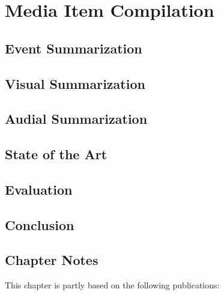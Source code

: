 

\chapter{Media Item Compilation}

\ifpdf
    \graphicspath{{8_media_item_compilation/figures/PNG/}{8_media_item_compilation/figures/PDF/}{8_media_item_compilation/figures/}}
\else
    \graphicspath{{8_media_item_compilation/figures/EPS/}{8_media_item_compilation/figures/}}
\fi


\section{Event Summarization}

\section{Visual Summarization}

\section{Audial Summarization}

\section{State of the Art}

\section{Evaluation}

\section{Conclusion}

\section*{Chapter Notes}
This chapter is partly based on the following publications:
